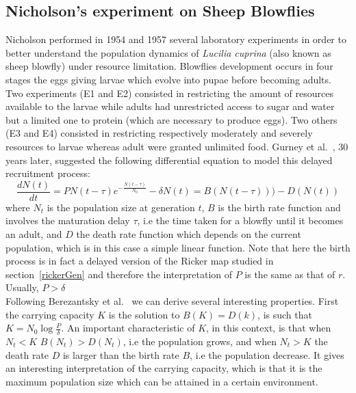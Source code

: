 \documentclass[12pt]{article}
\begin{document}
	\subsection{Nicholson's experiment on Sheep Blowflies} \label{(Nicholson)}
	Nicholson performed in 1954 and 1957 several
	laboratory experiments in order to better understand the population dynamics of \emph{Lucilia cuprina} (also known as sheep blowfly)
	under resource limitation. Blowflies development occurs in four stages the eggs giving larvae which evolve into pupae before becoming adults. Two experiments  (E1 and E2) consisted in restricting the amount of resources available to the larvae while adults had unrestricted access to sugar and water but a limited one to protein (which are necessary to produce eggs). Two others (E3 and E4) consisted in restricting respectively moderately and severely resources to larvae whereas adult were granted unlimited food. Gurney et al.~\cite{gurney1980nicholson}, 30 years later, suggested the following differential equation to model this delayed recruitment process:
	\begin{equation} \label{blow}
		\frac{d N(t)}{d t} = PN(t-\tau)e^{-\frac{N(t-\tau)}{N_0}} -  \delta N(t) = B(N(t-\tau))) - D(N(t))
	\end{equation} 
	where $N_t$ is the population size at generation $t$, $B$ is the birth rate function and involves the maturation delay $\tau$, i.e the time taken for a blowfly until it becomes an adult, and $D$ the death rate function which depends on the current population, which is in this case a simple linear function. Note that here the birth process is in fact a delayed version of the Ricker map studied in section~\ref{rickerGen} and therefore the interpretation of $P$ is the same as that of $r$. Usually, $P > \delta$ \\
	Following Berezantsky et al.~\cite{berezansky2010nicholson} we can derive several interesting properties. First the carrying capacity $K$ is the solution to $B(K)=D(k)$, is such that $K=N_0\log\frac{P}{\delta}$. An important characteristic of $K$, in this context, is that when $N_t < K$ $B(N_t) > D(N_t)$, i.e the population grows, and when $N_t > K$ the death rate $D$ is larger than the birth rate $B$, i.e the population decrease. It gives an interesting interpretation of the carrying capacity, which is that it is the maximum population size which can be attained in a certain environment.
	
\end{document}
